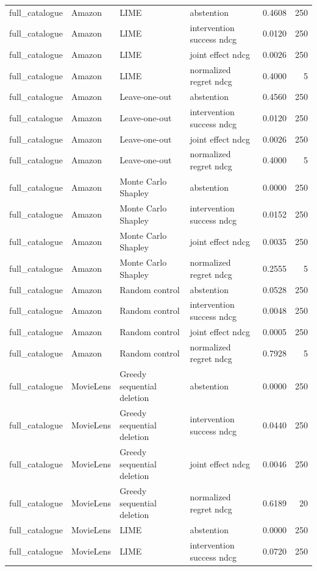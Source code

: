 \begin{longtable}{@{}p{.16\linewidth}p{.11\linewidth}p{.15\linewidth}p{.22\linewidth}rr@{}}
full\_catalogue & Amazon & LIME & abstention & 0.4608 & 250 \\
full\_catalogue & Amazon & LIME & intervention success ndcg & 0.0120 & 250 \\
full\_catalogue & Amazon & LIME & joint effect ndcg & 0.0026 & 250 \\
full\_catalogue & Amazon & LIME & normalized regret ndcg & 0.4000 & 5 \\
full\_catalogue & Amazon & Leave-one-out & abstention & 0.4560 & 250 \\
full\_catalogue & Amazon & Leave-one-out & intervention success ndcg & 0.0120 & 250 \\
full\_catalogue & Amazon & Leave-one-out & joint effect ndcg & 0.0026 & 250 \\
full\_catalogue & Amazon & Leave-one-out & normalized regret ndcg & 0.4000 & 5 \\
full\_catalogue & Amazon & Monte Carlo Shapley & abstention & 0.0000 & 250 \\
full\_catalogue & Amazon & Monte Carlo Shapley & intervention success ndcg & 0.0152 & 250 \\
full\_catalogue & Amazon & Monte Carlo Shapley & joint effect ndcg & 0.0035 & 250 \\
full\_catalogue & Amazon & Monte Carlo Shapley & normalized regret ndcg & 0.2555 & 5 \\
full\_catalogue & Amazon & Random control & abstention & 0.0528 & 250 \\
full\_catalogue & Amazon & Random control & intervention success ndcg & 0.0048 & 250 \\
full\_catalogue & Amazon & Random control & joint effect ndcg & 0.0005 & 250 \\
full\_catalogue & Amazon & Random control & normalized regret ndcg & 0.7928 & 5 \\
full\_catalogue & MovieLens & Greedy sequential deletion & abstention & 0.0000 & 250 \\
full\_catalogue & MovieLens & Greedy sequential deletion & intervention success ndcg & 0.0440 & 250 \\
full\_catalogue & MovieLens & Greedy sequential deletion & joint effect ndcg & 0.0046 & 250 \\
full\_catalogue & MovieLens & Greedy sequential deletion & normalized regret ndcg & 0.6189 & 20 \\
full\_catalogue & MovieLens & LIME & abstention & 0.0000 & 250 \\
full\_catalogue & MovieLens & LIME & intervention success ndcg & 0.0720 & 250 \\

\end{longtable}
